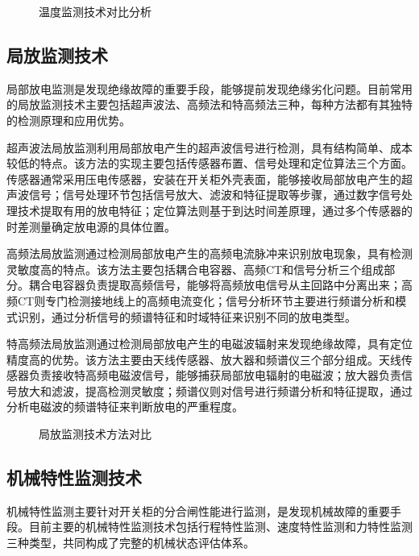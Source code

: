 \begin{figure}[h]
\centering
\caption{温度监测技术对比分析}
\label{fig:temperature_monitoring}
\end{figure}

\subsection{局放监测技术}

局部放电监测是发现绝缘故障的重要手段，能够提前发现绝缘劣化问题。目前常用的局放监测技术主要包括超声波法、高频法和特高频法三种，每种方法都有其独特的检测原理和应用优势。

超声波法局放监测利用局部放电产生的超声波信号进行检测，具有结构简单、成本较低的特点。该方法的实现主要包括传感器布置、信号处理和定位算法三个方面。传感器通常采用压电传感器，安装在开关柜外壳表面，能够接收局部放电产生的超声波信号；信号处理环节包括信号放大、滤波和特征提取等步骤，通过数字信号处理技术提取有用的放电特征；定位算法则基于到达时间差原理，通过多个传感器的时差测量确定放电源的具体位置。

高频法局放监测通过检测局部放电产生的高频电流脉冲来识别放电现象，具有检测灵敏度高的特点。该方法主要包括耦合电容器、高频CT和信号分析三个组成部分。耦合电容器负责提取高频信号，能够将高频放电信号从主回路中分离出来；高频CT则专门检测接地线上的高频电流变化；信号分析环节主要进行频谱分析和模式识别，通过分析信号的频谱特征和时域特征来识别不同的放电类型。

特高频法局放监测通过检测局部放电产生的电磁波辐射来发现绝缘故障，具有定位精度高的优势。该方法主要由天线传感器、放大器和频谱仪三个部分组成。天线传感器负责接收特高频电磁波信号，能够捕获局部放电辐射的电磁波；放大器负责信号放大和滤波，提高检测灵敏度；频谱仪则对信号进行频谱分析和特征提取，通过分析电磁波的频谱特征来判断放电的严重程度。

\begin{figure}[h]
\centering
\caption{局放监测技术方法对比}
\label{fig:pd_monitoring_methods}
\end{figure}

\subsection{机械特性监测技术}

机械特性监测主要针对开关柜的分合闸性能进行监测，是发现机械故障的重要手段。目前主要的机械特性监测技术包括行程特性监测、速度特性监测和力特性监测三种类型，共同构成了完整的机械状态评估体系。

